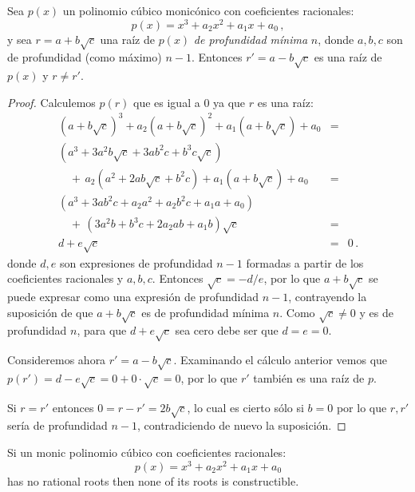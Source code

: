 \begin{theorem}\label{thm.trisect.conjugate}
Sea $p(x)$ un polinomio cúbico monicónico con coeficientes racionales:
\[
p(x)=x^3+a_2x^2+a_1x+a_0\,,
\]
y sea $r=a+b\sqrt{c}$ una raíz de $p(x)$ \emph{de profundidad mínima} $n$, donde $a,b,c$ son de profundidad (como máximo) $n-1$. Entonces $r'=a-b\sqrt{c}$ es una raíz de $p(x)$ y $r\neq r'$.
\end{theorem}

\begin{proof}
Calculemos $p(r)$ que es igual a $0$ ya que $r$ es una raíz:
\[
\renewcommand{\arraystretch}{1.4}
\begin{array}{lcr}
(a+b\sqrt{c})^3+a_2(a+b\sqrt{c})^2+a_1(a+b\sqrt{c})+a_0&=\\
(a^3+3a^2b\sqrt{c}+3ab^2c+b^3c\sqrt{c})\\
\quad+\,a_2(a^2+2ab\sqrt{c}+b^2c) +a_1(a+b\sqrt{c}) +a_0&=\\
(a^3+3ab^2c+a_2a^2+a_2b^2c+a_1a+a_0)\\
\quad+\,(3a^2b+b^3c+2a_2ab+a_1b)\sqrt{c}&=\\
d+e\sqrt{c}&=&0\,.
\end{array}
\]
donde $d,e$ son expresiones de profundidad $n-1$ formadas a partir de los coeficientes racionales y $a,b,c$. Entonces $\sqrt{c}=-d/e$, por lo que $a+b\sqrt{c}$ se puede expresar como una expresión de profundidad $n-1$, contrayendo la suposición de que $a+b\sqrt{c}$ es de profundidad mínima $n$. Como $\sqrt{c}\neq 0$ y es de profundidad $n$, para que $d+e\sqrt{c}$ sea cero debe ser que $d=e=0$.

Consideremos ahora $r'=a-b\sqrt{c}$. Examinando el cálculo anterior vemos que $p(r')=d-e\sqrt{c}=0+0\cdot\sqrt{c}=0$, por lo que $r'$ también es una raíz de $p$.

Si $r= r'$ entonces $0=r-r'=2b\sqrt{c}$, lo cual es cierto sólo si $b=0$ por lo que $r,r'$ sería de profundidad $n-1$, contradiciendo de nuevo la suposición.
\end{proof}                                

\begin{theorem}
Si un monic polinomio cúbico con coeficientes racionales:
\[p(x)=x^3+a_2x^2+a_1x+a_0\] has no rational roots then none of its roots is constructible.
\end{theorem}

